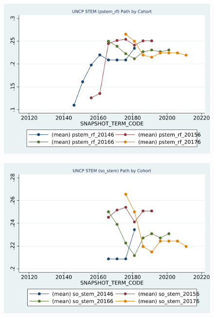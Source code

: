 \begin{figure}[h!]
\begin{centering}
\includegraphics[scale=1]{"figures/UNCP_pstem_rf_path_by_cohort_CAREER_STEM"}
\end{centering}
\end{figure}
\newpage
\begin{figure}[h!]
\begin{centering}
\includegraphics[scale=1]{"figures/UNCP_so_stem_path_by_cohort_CAREER_STEM"}
\end{centering}
\end{figure}
\newpage
